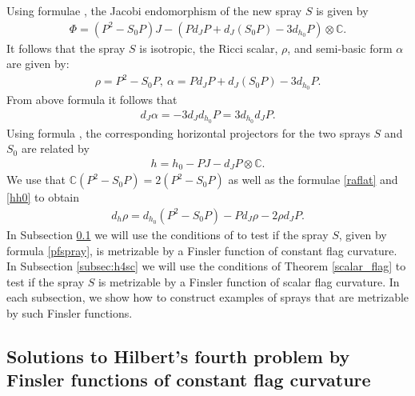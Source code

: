 \documentclass[oneside,english]{amsart}
\numberwithin{equation}{section}
\numberwithin{figure}{section}
\theoremstyle{plain}
\theoremstyle{plain}
\theoremstyle{definition}
\theoremstyle{plain}
\theoremstyle{plain}
\theoremstyle{plain}
\theoremstyle{remark}
\theoremstyle{remark}
\begin{document}
Using formulae \cite[(4.8)]{BM12a}, the
Jacobi endomorphism of the new spray $S$ is given by
\begin{eqnarray}
  \Phi = (P^2 - S_0P) J - (Pd_JP  + d_J(S_0P) - 3d_{h_0}P)\otimes
  \mathbb{C}. \label{pp0} \end{eqnarray}
It follows that the spray $S$ is isotropic, the Ricci scalar, $\rho$, and
semi-basic form $\alpha$ are given by:
\begin{eqnarray} \rho=P^2 - S_0P, \ \alpha = 
  Pd_JP  + d_J(S_0P) - 3d_{h_0}P. \label{raflat} \end{eqnarray}
From above formula it follows that 
\begin{eqnarray}
  d_J\alpha =-3d_Jd_{h_0}P= 3d_{h_0}d_JP. \label{dja0}\end{eqnarray}
Using formula \cite[(4.8)]{BM12a}, the corresponding horizontal
projectors for the two sprays $S$ and $S_0$ are related by 
\begin{eqnarray}
  h=h_0-PJ - d_JP\otimes \mathbb{C}. \label{hh0} \end{eqnarray}
We use that $\mathbb{C}(P^2-S_0P)=2 (P^2-S_0P)$ as
well as the formulae \eqref{raflat} and \eqref{hh0} to obtain
\begin{eqnarray}
  d_h\rho=d_{h_0}(P^2-S_0P) - Pd_J\rho - 2\rho d_JP. \label{dhr0} 
\end{eqnarray}
In Subsection \ref{subsec:h4cc} we will use the conditions of \cite[Thm. 4.1]{BM13} to test if
the spray $S$, given by formula \eqref{pfspray},  is metrizable by a Finsler function of constant flag
curvature. In Subsection \ref{subsec:h4sc} we will use the conditions of Theorem \ref{scalar_flag} to test if
the spray $S$ is metrizable by a Finsler function of scalar flag
curvature. In each subsection, we show how to construct examples of sprays that are
metrizable by such Finsler functions.


\subsection{Solutions to Hilbert's fourth problem by Finsler functions
  of constant flag curvature} \label{subsec:h4cc}
\end{document}
